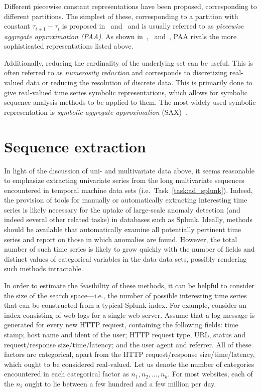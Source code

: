 Different piecewise constant representations have been proposed, corresponding to different partitions. The simplest of these, corresponding to a partition with constant $\tau_{i+1} - \tau_i$ is proposed in~\cite{keogh4} and~\cite{faloutsos2} and is usually referred to as \emph{piecewise aggregate approximation (PAA)}. As shown in~\cite{keogh5},~\cite{keogh3} and~\cite{faloutsos2}, PAA rivals the more sophisticated representations listed above.

Additionally, reducing the cardinality of the underlying set can be useful. This is often referred to as \emph{numerosity reduction} and corresponds to discretizing real-valued data or reducing the resolution of discrete data. This is primarily done to give real-valued time series symbolic representations, which allows for symbolic sequence analysis methods to be applied to them. The most widely used symbolic representation is \emph{symbolic aggregate approximation} (SAX)~\cite{sax}.

\section{Sequence extraction}
\label{sect:series_mining}

In light of the discussion of uni- and multivariate data above, it seems reasonable to emphasize extracting univariate series from the long multivariate sequences encountered in temporal machine data sets (i.e.\ Task~\ref{task:ad_splunk}). Indeed, the provision of tools for manually or automatically extracting interesting time series is likely necessary for the uptake of large-scale anomaly detection (and indeed several other related tasks) in databases such as Splunk. Ideally, methods should be available that automatically examine all potentially pertinent time series and report on those in which anomalies are found. However, the total number of such time series is likely to grow quickly with the number of fields and distinct values of categorical variables in the data data sets, possibly rendering such methods intractable.

In order to estimate the feasibility of these methods, it can be helpful to consider the size of the search space---i.e.\@, the number of possible interesting time series that can be constructed from a typical Splunk index. For example, consider an index consisting of web logs for a single web server. Assume that a log message is generated for every new HTTP request, containing the following fields: time stamp; host name and ident of the user; HTTP request type, URL, status and request/response size/time/latency; and the user agent and referrer. All of these factors are categorical, apart from the HTTP request/response size/time/latency, which ought to be considered real-valued. Let us denote the number of categories encountered in each categorical factor as $n_1, n_2, \dots, n_k$. For most websites, each of the $n_i$ ought to lie between a few hundred and a few million per day.

